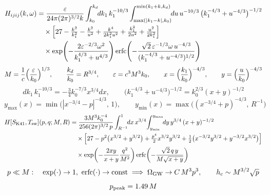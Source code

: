 \documentclass[10pt,prd,aps,nobibnotes,superscriptaddress,preprintnumbers,notitlepage]{revtex4-1}
\newcommand{\Omgw}{\Omega_{\rm GW}}
\begin{document}
\begin{align}
  H_{ijij}(k,\omega)&=\frac{\varepsilon}{24\pi(2\pi)^{3/2}k}
  \int_{k_0}^{k_d}\!\!dk_1\,k_1^{-10/3}
  \int_{\max(|k_1-k|,k_0)}^{\min(k_1+k,k_d)}\!\!du\,u^{-10/3}\,
  \bigl(k_1^{-4/3}+u^{-4/3}\bigr)^{-1/2}
  \nonumber\\
  &\quad\times\Bigl[27-\tfrac{k^2}{k_1^2}-\tfrac{k^2}{u^2}
   +\tfrac{k^4}{2k_1^2u^2}+\tfrac{k_1^2}{2u^2}+\tfrac{u^2}{2k_1^2}\Bigr]
  \nonumber\\
  &\quad\times\exp\!\left(-\frac{2\varepsilon^{-2/3}\omega^2}{k_1^{4/3}+u^{4/3}}\right)
  \operatorname{erfc}\!\left(-\frac{\sqrt2\,\varepsilon^{-1/3}\omega\,u^{-4/3}}
  {(k_1^{-4/3}+u^{-4/3})^{1/2}}\right)
  \label{A:AppA}
\end{align}
\begin{equation}
  M=\frac{1}{c}\Bigl(\frac{\varepsilon}{k_0}\Bigr)^{1/3},
  \qquad
  \frac{k_d}{k_0}=R^{3/4},
  \qquad
  \varepsilon=c^3M^3k_0,
  \qquad
  x=\Bigl(\frac{k_1}{k_0}\Bigr)^{-4/3},
  \qquad
  y=\Bigl(\frac{u}{k_0}\Bigr)^{-4/3}
  \label{A:dimless}
\end{equation}
\begin{equation}
  dk_1\,k_1^{-10/3}=-\tfrac34k_0^{-7/3}x^{3/4}dx,
  \qquad
  \bigl(k_1^{-4/3}+u^{-4/3}\bigr)^{-1/2}=k_0^{2/3}(x+y)^{-1/2}
  \label{A:jacobian}
\end{equation}
\begin{equation}
  y_{\max}(x)=\min\bigl(|x^{-3/4}-p|^{-4/3},\,1\bigr),
  \qquad
  y_{\min}(x)=\max\bigl((x^{-3/4}+p)^{-4/3},\,R^{-1}\bigr)
  \label{A:ybounds}
\end{equation}
\begin{align}
  H[S_{\rm K41},T_{\rm sw}](p,q;M,R)&=\frac{3M^3k_0^{-4}}{256(2\pi)^{3/2}\,p}
  \int_{R^{-1}}^{1}\!\!dx\,x^{3/4}\!\int_{y_{\min}}^{y_{\max}}\!\!dy\,y^{3/4}\,(x+y)^{-1/2}
  \nonumber\\
  &\quad\times\Bigl[27-p^2\bigl(x^{3/2}+y^{3/2}\bigr)+\tfrac{p^4}{2}x^{3/2}y^{3/2}
   +\tfrac12\bigl(x^{-3/2}y^{3/2}+y^{-3/2}x^{3/2}\bigr)\Bigr]
  \nonumber\\
  &\quad\times\exp\!\left(-\frac{2xy}{x+y}\frac{q^2}{M^2}\right)
  \operatorname{erfc}\!\left(-\frac{\sqrt2\,q\,y}{M\sqrt{x+y}}\right)
  \label{A:AppAdimless}
\end{align}
\begin{equation}
  p\ll M:\quad
  \exp(\cdot)\to1,\ \operatorname{erfc}(\cdot)\to\text{const}
  \;\Longrightarrow\;
  \Omgw\to C\,M^3p^3,
  \qquad h_c\sim M^{3/2}\sqrt{p}
  \label{A:IRK41}
\end{equation}
\begin{equation}
  p_{\rm peak}=1.49\,M
  \label{A:peakK41}
\end{equation}
\end{document}
